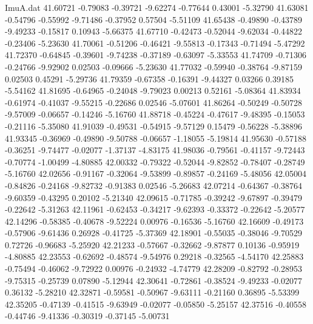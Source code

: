 \begin{filecontents}{ImuA.dat}
  41.60721   -0.79083   -0.39721   -9.62274   -0.77644    0.43001   -5.32790
  41.63081   -0.54796   -0.55992   -9.71486   -0.37952    0.57504   -5.51109
  41.65438   -0.49890   -0.43789   -9.49233   -0.15817    0.10943   -5.66375
  41.67710   -0.42473   -0.52044   -9.62034   -0.44822   -0.23406   -5.23630
  41.70061   -0.51206   -0.46421   -9.55813   -0.17343   -0.71494   -5.47292
  41.72370   -0.64845   -0.39601   -9.74238   -0.37189   -0.63097   -5.33553
  41.74709   -0.71306   -0.24766   -9.92902    0.02503   -0.09666   -5.23630
  41.77032   -0.59940   -0.38764   -9.87159    0.02503    0.45291   -5.29736
  41.79359   -0.67358   -0.16391   -9.44327    0.03266    0.39185   -5.54162
  41.81695   -0.64965   -0.24048   -9.79023    0.00213    0.52161   -5.08364
  41.83934   -0.61974   -0.41037   -9.55215   -0.22686    0.02546   -5.07601
  41.86264   -0.50249   -0.50728   -9.57009   -0.06657   -0.14246   -5.16760
  41.88718   -0.45224   -0.47617   -9.48395   -0.15053   -0.21116   -5.35080
  41.91039   -0.49531   -0.54915   -9.57129    0.15479   -0.56228   -5.38896
  41.93345   -0.36969   -0.49890   -9.50788   -0.06657   -1.18055   -5.19814
  41.95630   -0.57188   -0.36251   -9.74477   -0.02077   -1.37137   -4.83175
  41.98036   -0.79561   -0.41157   -9.72443   -0.70774   -1.00499   -4.80885
  42.00332   -0.79322   -0.52044   -9.82852   -0.78407   -0.28749   -5.16760
  42.02656   -0.91167   -0.32064   -9.53899   -0.89857   -0.24169   -5.48056
  42.05004   -0.84826   -0.24168   -9.82732   -0.91383    0.02546   -5.26683
  42.07214   -0.64367   -0.38764   -9.60359   -0.43295    0.20102   -5.21340
  42.09615   -0.71785   -0.39242   -9.67897   -0.39479   -0.22642   -5.31263
  42.11961   -0.62453   -0.34217   -9.62393   -0.33372   -0.22642   -5.20577
  42.14296   -0.58385   -0.40678   -9.52224    0.00976   -0.16536   -5.16760
  42.16609   -0.49173   -0.57906   -9.61436    0.26928   -0.41725   -5.37369
  42.18901   -0.55035   -0.38046   -9.70529    0.72726   -0.96683   -5.25920
  42.21233   -0.57667   -0.32662   -9.87877    0.10136   -0.95919   -4.80885
  42.23553   -0.62692   -0.48574   -9.54976    0.29218   -0.32565   -4.54170
  42.25883   -0.75494   -0.46062   -9.72922    0.00976   -0.24932   -4.74779
  42.28209   -0.82792   -0.28953   -9.75315   -0.25739    0.07890   -5.12944
  42.30641   -0.72861   -0.38524   -9.49233   -0.02077    0.36132   -5.28210
  42.32871   -0.59581   -0.50967   -9.63111   -0.21160    0.36895   -5.53399
  42.35205   -0.47139   -0.41515   -9.63949   -0.02077   -0.05850   -5.25157
  42.37516   -0.40558   -0.44746   -9.41336   -0.30319   -0.37145   -5.00731

\end{filecontents}
